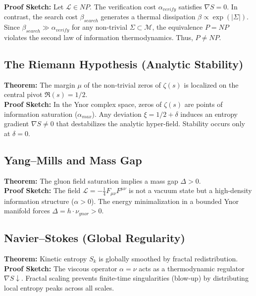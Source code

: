 ﻿\documentclass[12pt,a4paper]{article}
\begin{document}
\textbf{Proof Sketch:} Let $\mathcal{L} \in NP$. The verification cost $\alpha_{verify}$ satisfies $\nabla S = 0$. In contrast, the search cost $\beta_{search}$ generates a thermal dissipation $\beta \propto \exp(|\Sigma|)$. Since $\beta_{search} \gg \alpha_{verify}$ for any non-trivial $\Sigma \subset \mathcal{M}$, the equivalence $P=NP$ violates the second law of information thermodynamics. Thus, $P \neq NP$.



\subsection{The Riemann Hypothesis (Analytic Stability)}

\textbf{Theorem:} The margin $\mu$ of the non-trivial zeros of $\zeta(s)$ is localized on the central pivot $\Re(s) = 1/2$. \\

\textbf{Proof Sketch:} In the Ynor complex space, zeros of $\zeta(s)$ are points of information saturation ($\alpha_{max}$). Any deviation $\xi = 1/2 + \delta$ induces an entropy gradient $\nabla S \neq 0$ that destabilizes the analytic hyper-field. Stability occurs only at $\delta = 0$.



\subsection{Yang--Mills and Mass Gap}

\textbf{Theorem:} The gluon field saturation implies a mass gap $\Delta > 0$. \\

\textbf{Proof Sketch:} The field $\mathcal{L} = -\frac{1}{4} F_{\mu\nu} F^{\mu\nu}$ is not a vacuum state but a high-density information structure ($\alpha > 0$). The energy minimalization in a bounded Ynor manifold forces $\Delta = h \cdot \nu_{ynor} > 0$.



\subsection{Navier--Stokes (Global Regularity)}

\textbf{Theorem:} Kinetic entropy $S_k$ is globally smoothed by fractal redistribution. \\

\textbf{Proof Sketch:} The viscous operator $\alpha = \nu$ acts as a thermodynamic regulator $\nabla S \downarrow$. Fractal scaling prevents finite-time singularities (blow-up) by distributing local entropy peaks across all scales.
\end{document}
